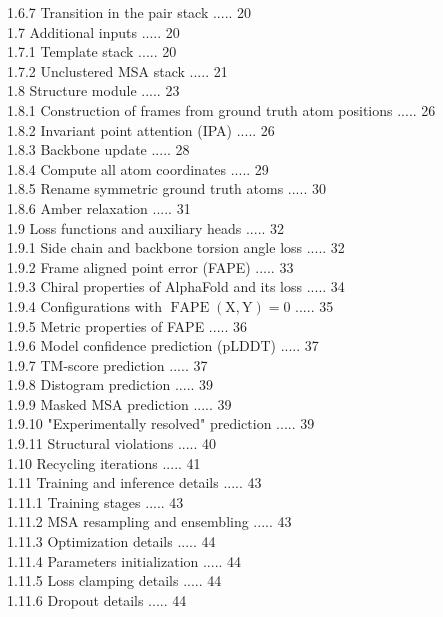 \documentclass[10pt]{article}
\begin{document}
1.6.7 Transition in the pair stack ..... 20\\
1.7 Additional inputs ..... 20\\
1.7.1 Template stack ..... 20\\
1.7.2 Unclustered MSA stack ..... 21\\
1.8 Structure module ..... 23\\
1.8.1 Construction of frames from ground truth atom positions ..... 26\\
1.8.2 Invariant point attention (IPA) ..... 26\\
1.8.3 Backbone update ..... 28\\
1.8.4 Compute all atom coordinates ..... 29\\
1.8.5 Rename symmetric ground truth atoms ..... 30\\
1.8.6 Amber relaxation ..... 31\\
1.9 Loss functions and auxiliary heads ..... 32\\
1.9.1 Side chain and backbone torsion angle loss ..... 32\\
1.9.2 Frame aligned point error (FAPE) ..... 33\\
1.9.3 Chiral properties of AlphaFold and its loss ..... 34\\
1.9.4 Configurations with $\operatorname{FAPE}(\mathrm{X}, \mathrm{Y})=0$ ..... 35\\
1.9.5 Metric properties of FAPE ..... 36\\
1.9.6 Model confidence prediction (pLDDT) ..... 37\\
1.9.7 TM-score prediction ..... 37\\
1.9.8 Distogram prediction ..... 39\\
1.9.9 Masked MSA prediction ..... 39\\
1.9.10 "Experimentally resolved" prediction ..... 39\\
1.9.11 Structural violations ..... 40\\
1.10 Recycling iterations ..... 41\\
1.11 Training and inference details ..... 43\\
1.11.1 Training stages ..... 43\\
1.11.2 MSA resampling and ensembling ..... 43\\
1.11.3 Optimization details ..... 44\\
1.11.4 Parameters initialization ..... 44\\
1.11.5 Loss clamping details ..... 44\\
1.11.6 Dropout details ..... 44\\
\end{document}
